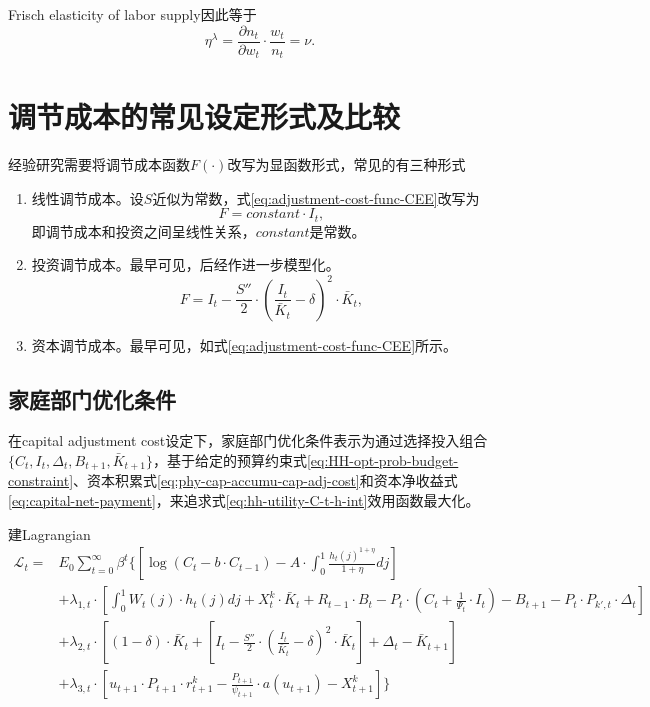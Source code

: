 Frisch elasticity of labor supply因此等于
\begin{equation}
  \label{eq:Frisch-example-ela}
  \eta^{\lambda} = \frac{\partial n_t}{\partial w_t} \cdot \frac{w_t}{n_t} = \nu.
\end{equation}

\section{调节成本的常见设定形式及比较}
\label{sec:adjustment-cost-types-compar}
经验研究需要将调节成本函数$F(\cdot)$改写为显函数形式，常见的有三种形式
\begin{enumerate}
\item  线性调节成本。设$S$近似为常数，式\eqref{eq:adjustment-cost-func-CEE}改写为
\begin{equation}
\label{eq:adjustment-cost-lin}
F = constant \cdot I_t,
\end{equation}
即调节成本和投资之间呈线性关系，$constant$是常数。
\item 投资调节成本。最早可见\cite{Lucasjoin:1971hx}，后经\cite{Hayashi:1982bc}作进一步模型化。
\begin{equation}
\label{eq:adjustment-cost-capital}
F = I_t - \frac{S''}{2} \cdot \left(\frac{I_t}{\bar{K}_t} - \delta \right)^2 \cdot \bar{K}_{t},
\end{equation}
\item 资本调节成本。最早可见\cite{Christiano:2005ib}，如式\eqref{eq:adjustment-cost-func-CEE}所示。
\end{enumerate}



\subsection{家庭部门优化条件}
\label{sec:adj-cost-hh-optimisation}
在capital adjustment cost设定下，家庭部门优化条件表示为通过选择投入组合$\{ C_t, I_t, \Delta_t, B_{t+1}, \bar{K}_{t+1}\}$，基于给定的预算约束式\eqref{eq:HH-opt-prob-budget-constraint}、资本积累式\eqref{eq:phy-cap-accumu-cap-adj-cost}和资本净收益式\eqref{eq:capital-net-payment}，来追求式\eqref{eq:hh-utility-C-t-h-int}效用函数最大化。

建Lagrangian
\begin{align*}
\mathcal{L}_t =&E_0 \sum_{t=0}^{\infty} \beta^t \{\left[\log(C_t - b \cdot C_{t-1}) - A \cdot \int_{0}^{1} \frac{h_{t}(j)^{1+\eta}}{1+\eta} dj\right] \\
&+\lambda_{1,t} \cdot \left[
\int_{0}^{1} W_{t}(j) \cdot h_{t}(j) dj + X^k_t \cdot \bar{K}_t
 + R_{t-1} \cdot B_t - P_t \cdot \left(C_t + \frac{1}{\Psi_t} \cdot I_t \right) - B_{t+1} - P_t \cdot P_{k',t} \cdot \Delta_t
\right] \\
&+\lambda_{2,t} \cdot \left[
(1-\delta) \cdot \bar{K}_t + \left[I_t - \frac{S''}{2} \cdot \left(\frac{I_t}{\bar{K}_t} - \delta \right)^2  \cdot \bar{K}_{t}\right] + \Delta_t - \bar{K}_{t+1}
\right] \\
&+\lambda_{3,t} \cdot \left[
 u_{t+1} \cdot P_{t+1} \cdot r_{t+1}^k - \frac{P_{t+1}}{\psi_{t+1}} \cdot a(u_{t+1}) - X_{t+1}^k
\right]\}
\end{align*}

